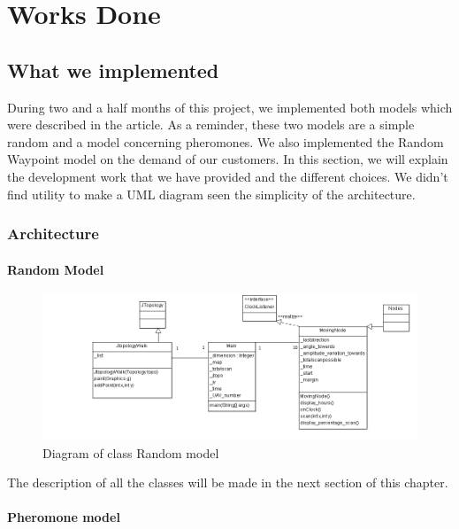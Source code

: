 \chapter{Works Done}

\section{What we implemented}

During two and a half months of this project, we implemented both models which were described in the article. As a reminder, these two models are a simple random and a model concerning pheromones. We also implemented the Random Waypoint model on the demand of our customers. In this section, we will explain the development work that we have provided and the different choices. We didn't find utility to make a UML diagram seen the simplicity of the architecture.

\subsection{Architecture}

\subsubsection{Random Model}

\begin{figure}[h]
\center
\includegraphics[scale=0.7]{../images/DiagrammedeclassesRandom.png}
\caption{\label{RandomWalkDIA}Diagram of class Random model}
\end{figure}

The description of all the classes will be made in the next section of this chapter.
\subsubsection{Pheromone model}


